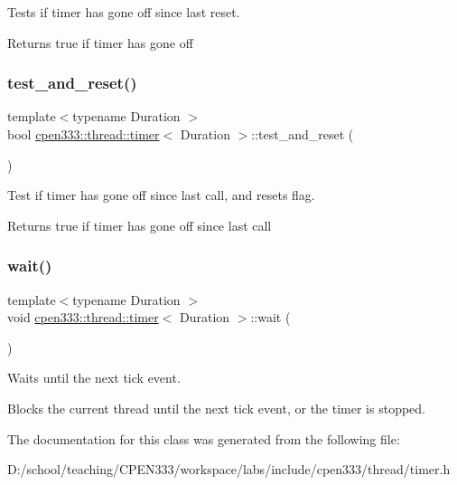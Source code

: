 Tests if timer has gone off since last reset. 

\begin{DoxyReturn}{Returns}
true if timer has gone off 
\end{DoxyReturn}
\mbox{\label{classcpen333_1_1thread_1_1timer_a6fc134f093e0ff35ef1baebefd62ed8b}} 
\subsubsection{\texorpdfstring{test\+\_\+and\+\_\+reset()}{test\_and\_reset()}}
{\footnotesize\ttfamily template$<$typename Duration $>$ \\
bool \hyperlink{classcpen333_1_1thread_1_1timer}{cpen333\+::thread\+::timer}$<$ Duration $>$\+::test\+\_\+and\+\_\+reset (\begin{DoxyParamCaption}{ }\end{DoxyParamCaption})\hspace{0.3cm}{\ttfamily [inline]}}



Test if timer has gone off since last call, and resets flag. 

\begin{DoxyReturn}{Returns}
true if timer has gone off since last call 
\end{DoxyReturn}
\mbox{\label{classcpen333_1_1thread_1_1timer_aecbb193d8d58a41488881fd795aac9e1}} 
\subsubsection{\texorpdfstring{wait()}{wait()}}
{\footnotesize\ttfamily template$<$typename Duration $>$ \\
void \hyperlink{classcpen333_1_1thread_1_1timer}{cpen333\+::thread\+::timer}$<$ Duration $>$\+::wait (\begin{DoxyParamCaption}{ }\end{DoxyParamCaption})\hspace{0.3cm}{\ttfamily [inline]}}



Waits until the next tick event. 

Blocks the current thread until the next tick event, or the timer is stopped. 

The documentation for this class was generated from the following file\+:\begin{DoxyCompactItemize}
\item 
D\+:/school/teaching/\+C\+P\+E\+N333/workspace/labs/include/cpen333/thread/timer.\+h\end{DoxyCompactItemize}
